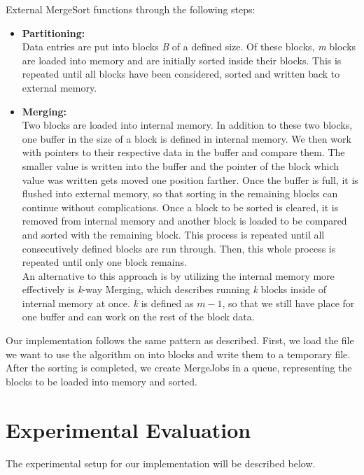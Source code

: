 \documentclass[twocolumn]{article}
\begin{document}
External MergeSort functions through the following steps:
\begin{itemize}
	\item \textbf{Partitioning:}\\
	Data entries are put into blocks \textit{B} of a defined size. Of these blocks, \textit{m} blocks are loaded into memory and are initially sorted inside their blocks. This is repeated until all blocks have been considered, sorted and written back to external memory.
	\item \textbf{Merging:}\\
	Two blocks are loaded into internal memory. In addition to these two blocks, one buffer in the size of a block is defined in internal memory. We then work with pointers to their respective data in the buffer and compare them. The smaller value is written into the buffer and the pointer of the block which value was written gets moved one position farther. Once the buffer is full, it is flushed into external memory, so that sorting in the remaining blocks can continue without complications. Once a block to be sorted is cleared, it is removed from internal memory and another block is loaded to be compared and sorted with the remaining block. This process is repeated until all consecutively defined blocks are run through. Then, this whole process is repeated until only one block remains.\\
	An alternative to this approach is by utilizing the internal memory more effectively is \textit{k}-way Merging, which describes running \textit{k} blocks inside of internal memory at once. \textit{k} is defined as $m-1$, so that we still have place for one buffer and can work on the rest of the block data.
	
\end{itemize}

Our implementation follows the same pattern as described. First, we load the file we want to use the algorithm on into blocks and write them to a temporary file. After the sorting is completed, we create MergeJobs in a queue, representing the blocks to be loaded into memory and sorted.


\section{Experimental Evaluation}
The experimental setup for our implementation will be described below.
\end{document}
